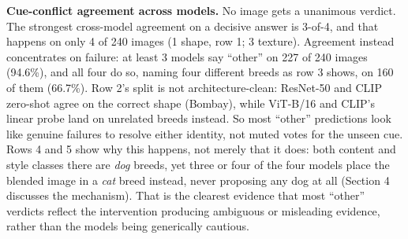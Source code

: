 \documentclass{article}
\begin{document}
\begin{table}[h]
  \centering
  \caption{Selected cue-conflict outcomes across the four models. Source: \texttt{cue\_conflict\_predictions.csv}.}
  \label{tab:task1-cueconflict-examples}
  \small
\end{table}

\textbf{Cue-conflict agreement across models.} No image gets a unanimous verdict. The strongest
cross-model agreement on a decisive answer is 3-of-4, and that happens on only 4 of 240 images (1
shape, row 1; 3 texture). Agreement instead concentrates on failure: at least 3 models say
``other'' on 227 of 240 images (94.6\%), and all four do so, naming four different breeds as row 3
shows, on 160 of them (66.7\%). Row 2's split is not architecture-clean: ResNet-50 and CLIP
zero-shot agree on the correct shape (Bombay), while ViT-B/16 and CLIP's linear probe land on
unrelated breeds instead. So most ``other'' predictions look like genuine failures to resolve
either identity, not muted votes for the unseen cue. Rows 4 and 5 show why this happens, not merely
that it does: both content and style classes there are \emph{dog} breeds, yet three or four of the
four models place the blended image in a \emph{cat} breed instead, never proposing any dog at all
(Section 4 discusses the mechanism). That is the clearest evidence that most ``other'' verdicts
reflect the intervention producing ambiguous or misleading evidence, rather than the models being
generically cautious.
\end{document}
